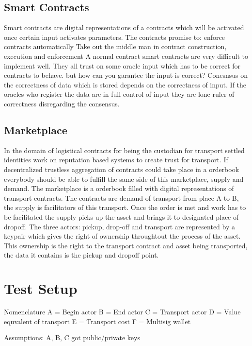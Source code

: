 \documentclass[Nomencl]{DylanMaster}
\begin{document}
\subsection{Smart Contracts}

Smart contracts are digital representations of a contracts which will be activated once certain input activates parameters. The contracts promise to:
 enforce contracts automatically
Take out the middle man in contract construction, execution and enforcement
A normal contract
smart contracts are very difficult to implement well. They all trust on some oracle input which has to be correct for contracts to behave.  but how can you garantee the input is correct? Conesnsus on the correctness of data which is stored depends on the correctness of input. If the oracles who register the data are in full control of input they are lone ruler of correctness disregarding the consensus.

\subsection{Marketplace}

In the domain of logistical contracts for being the custodian for transport settled identities work on reputation based systems to create trust for transport. If decentralized trustless aggregation of contracts could take place in a orderbook everybody should be able to fulfill the same side of this marketplace, supply and demand.
The marketplace is a orderbook filled with digital representations of transport contracts. The contracts are demand of transport from place A to B, the supply is facilitators of this transport. Once the order is met and work has to be facilitated the supply picks up the asset and brings it to designated place of dropoff. The three actors: pickup, drop-off and transport are represented by a keypair which gives the right of ownership throughtout the process of the asset. This ownership is the right to the transport contract and asset being transported, the data it contains is the pickup and dropoff point.

\section{Test Setup}

Nomenclature
A = Begin actor
B = End actor
C = Transport actor
D = Value equvalent of transport
E = Transport cost
F = Multisig wallet

Assumptions:
A, B, C got public/private keys
\end{document}
